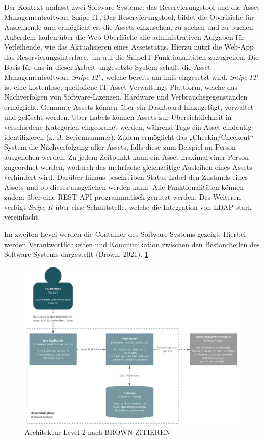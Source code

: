 Der Kontext umfasst zwei Software-Systeme: das Reservierungstool und die Asset Managementsoftware
Snipe-IT. Das Reservierungstool, bildet die Oberfläche für Ausleihende und ermöglicht es, die Assets
einzusehen, zu suchen und zu buchen. Außerdem laufen über die Web-Oberfläche alle administrativen
Aufgaben für Verleihende, wie das Aktualisieren eines Assetstatus. Hierzu nutzt die Web-App das
Reservierungsinterface, um auf die SnipeIT Funktionalitäten zuzugreifen.  
Die Basis für das in dieser Arbeit umgesetzte System schafft die Asset Managementsoftware
\textit{Snipe-IT} \cite{noauthor_home_nodate}, welche bereits am \ac{imis} eingesetzt wird.
\textit{Snipe-IT} ist eine kostenlose, quelloffene IT-Asset-Verwaltungs-Plattform, welche das
Nachverfolgen von Software-Lizenzen, Hardware und Verbrauchsgegenständen ermöglicht. Genannte Assets
können über ein Dashboard hinzugefügt, verwaltet und gelöscht werden. Über Labels können Assets zur
Übersichtlichkeit in verschiedene Kategorien eingeordnet werden, während Tags ein Asset eindeutig
identifizieren (z. B. Seriennummer). Zudem ermöglicht das „Checkin/Checkout“-System die
Nachverfolgung aller Assets, falls diese zum Beispiel an Person ausgeliehen werden. Zu jedem
Zeitpunkt kann ein Asset maximal einer Person zugeordnet werden, wodurch das mehrfache gleichzeitige
Ausleihen eines Assets verhindert wird. Darüber hinaus beschreiben Status-Label den Zustands eines
Assets und ob dieses ausgeliehen werden kann. Alle Funktionalitäten können zudem über eine REST-API
programmatisch genutzt werden. Des Weiteren verfügt \textit{Snipe-It} über eine Schnittstelle,
welche die Integration von LDAP stark vereinfacht.

{\sffamily\color{maincolor}{Level 2: Container}}

Im zweiten Level werden die Container des Software-Systems gezeigt. Hierbei werden Verantwortlichkeiten und
Kommunikation zwischen den Bestandteilen des Software-Systems dargestellt (Brown, 2021). \ref{fig:level2}

\begin{figure}[h]
    \centering
    \includegraphics[scale=0.47]{Bilder/level2.pdf}
    \caption[Architektur Level 2]{Architektur Level 2 nach BROWN ZITIEREN}
    \label{fig:level2}
\end{figure}

